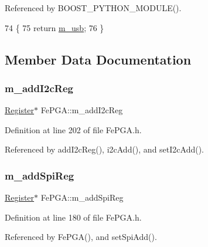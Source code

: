 Referenced by B\+O\+O\+S\+T\+\_\+\+P\+Y\+T\+H\+O\+N\+\_\+\+M\+O\+D\+U\+L\+E().


\begin{DoxyCode}
74                          \{
75     \textcolor{keywordflow}{return} \hyperlink{classFePGA_afb7947e600a66d914ee524acec3d8b1f}{m\_usb};
76   \}
\end{DoxyCode}


\subsection{Member Data Documentation}
\mbox{\label{classFePGA_af3ef3467ba803e6d3b970ea8982d6246}} 
\subsubsection{\texorpdfstring{m\+\_\+add\+I2c\+Reg}{m\_addI2cReg}}
{\footnotesize\ttfamily \hyperlink{classRegister}{Register}$\ast$ Fe\+P\+G\+A\+::m\+\_\+add\+I2c\+Reg\hspace{0.3cm}{\ttfamily [private]}}



Definition at line 202 of file Fe\+P\+G\+A.\+h.



Referenced by add\+I2c\+Reg(), i2c\+Add(), and set\+I2c\+Add().

\mbox{\label{classFePGA_a569eb8410924bec1c8279ca80dc37a6a}} 
\subsubsection{\texorpdfstring{m\+\_\+add\+Spi\+Reg}{m\_addSpiReg}}
{\footnotesize\ttfamily \hyperlink{classRegister}{Register}$\ast$ Fe\+P\+G\+A\+::m\+\_\+add\+Spi\+Reg\hspace{0.3cm}{\ttfamily [private]}}



Definition at line 180 of file Fe\+P\+G\+A.\+h.



Referenced by Fe\+P\+G\+A(), and set\+Spi\+Add().

\mbox{\label{classFePGA_a8fb76733a688dff6d91892a49a97a21f}} 
